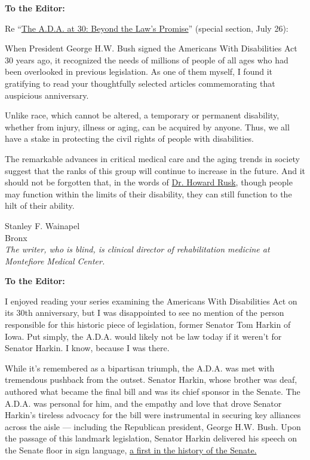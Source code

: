 \textbf{To the Editor:}

Re
``\href{https://www.nytimes.com/interactive/2020/us/disability-ADA-30-anniversary.html}{The
A.D.A. at 30: Beyond the Law's Promise}'' (special section, July 26):

When President George H.W. Bush signed the Americans With Disabilities
Act 30 years ago, it recognized the needs of millions of people of all
ages who had been overlooked in previous legislation. As one of them
myself, I found it gratifying to read your thoughtfully selected
articles commemorating that auspicious anniversary.

Unlike race, which cannot be altered, a temporary or permanent
disability, whether from injury, illness or aging, can be acquired by
anyone. Thus, we all have a stake in protecting the civil rights of
people with disabilities.

The remarkable advances in critical medical care and the aging trends in
society suggest that the ranks of this group will continue to increase
in the future. And it should not be forgotten that, in the words of
\href{https://www.nytimes.com/1989/11/05/obituaries/howard-rusk-88-dies-medical-pioneer.html}{Dr.
Howard Rusk}, though people may function within the limits of their
disability, they can still function to the hilt of their ability.

Stanley F. Wainapel\\
Bronx\\
\emph{The writer, who is blind, is clinical director of rehabilitation
medicine at Montefiore Medical Center.}

\textbf{To the Editor:}

I enjoyed reading your series examining the Americans With Disabilities
Act on its 30th anniversary, but I was disappointed to see no mention of
the person responsible for this historic piece of legislation, former
Senator Tom Harkin of Iowa. Put simply, the A.D.A. would likely not be
law today if it weren't for Senator Harkin. I know, because I was there.

While it's remembered as a bipartisan triumph, the A.D.A. was met with
tremendous pushback from the outset. Senator Harkin, whose brother was
deaf, authored what became the final bill and was its chief sponsor in
the Senate. The A.D.A. was personal for him, and the empathy and love
that drove Senator Harkin's tireless advocacy for the bill were
instrumental in securing key alliances across the aisle --- including
the Republican president, George H.W. Bush. Upon the passage of this
landmark legislation, Senator Harkin delivered his speech on the Senate
floor in sign language,
\href{https://disabilityvisibilityproject.com/2014/07/26/disability-history-senator-harkin-delivers-floor-speech-in-american-sign-language-upon-passage-of-the-ada-71390/}{a
first in the history of the Senate.}

